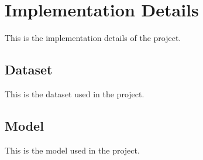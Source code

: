 \section{Implementation Details}
This is the implementation details of the project.

\subsection{Dataset}
This is the dataset used in the project.

\subsection{Model}
This is the model used in the project.

